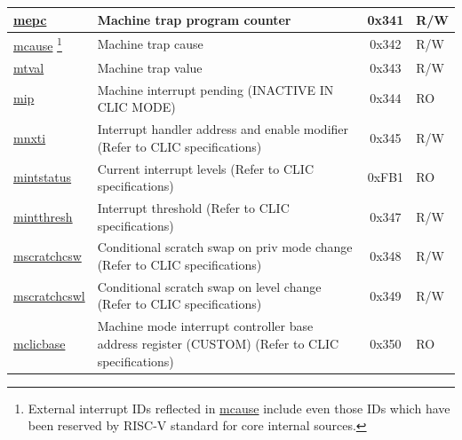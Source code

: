 \begin{longtable}{ | p{4.0cm} | p{8.4cm} | c | l | }
\hyperref[regdesc:MEPC]{mepc} & Machine trap program counter & 0x341 & R/W \\\hline
\hyperref[regdesc:MCAUSE]{mcause} \footnote{External interrupt IDs reflected in \hyperref[regdesc:MCAUSE]{mcause} include even those IDs which have been reserved by RISC-V standard for core internal sources.} & Machine trap cause & 0x342 & R/W \\\hline
\hyperref[regdesc:MTVAL]{mtval} & Machine trap value & 0x343 & R/W \\\hline
\hyperref[regdesc:MIP_REG]{mip} & Machine interrupt pending (INACTIVE IN CLIC MODE) & 0x344 & RO \\\hline
\hyperref[regdesc:MNXTI_REG]{mnxti} & Interrupt handler address and enable modifier (Refer to CLIC specifications) & 0x345 & R/W \\\hline
\hyperref[regdesc:MINTSTATUS]{mintstatus} & Current interrupt levels (Refer to CLIC specifications) & 0xFB1 & RO \\\hline
\hyperref[regdesc:MINTTHRESH]{mintthresh} & Interrupt threshold (Refer to CLIC specifications) & 0x347 & R/W \\\hline
\hyperref[regdesc:MSCRATCHCSW_REG]{mscratchcsw} & Conditional scratch swap on priv mode change (Refer to CLIC specifications) & 0x348 & R/W \\\hline
\hyperref[regdesc:MSCRATCHCSWL_REG]{mscratchcswl} & Conditional scratch swap on level change (Refer to CLIC specifications) & 0x349 & R/W \\\hline
\hyperref[regdesc:MCLICBASE_REG]{mclicbase} & Machine mode interrupt controller base address register (CUSTOM) (Refer to CLIC specifications) & 0x350 & RO \\\hline


\end{longtable}
